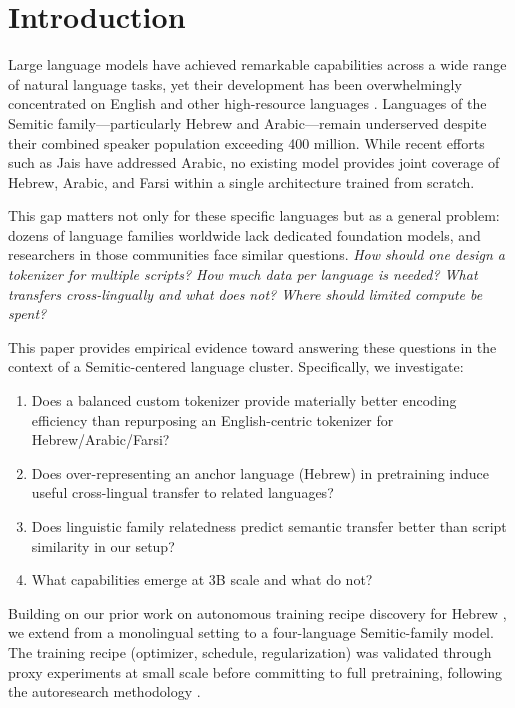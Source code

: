 \documentclass[10pt,twocolumn]{article}
\begin{document}
\section{Introduction}

Large language models have achieved remarkable capabilities across a wide range of natural language tasks, yet their development has been overwhelmingly concentrated on English and other high-resource languages \citep{joshi2020state}. Languages of the Semitic family---particularly Hebrew and Arabic---remain underserved despite their combined speaker population exceeding 400 million. While recent efforts such as Jais \citep{sengupta2023jais} have addressed Arabic, no existing model provides joint coverage of Hebrew, Arabic, and Farsi within a single architecture trained from scratch.

This gap matters not only for these specific languages but as a general problem: dozens of language families worldwide lack dedicated foundation models, and researchers in those communities face similar questions. \emph{How should one design a tokenizer for multiple scripts? How much data per language is needed? What transfers cross-lingually and what does not? Where should limited compute be spent?}

This paper provides empirical evidence toward answering these questions in the context of a Semitic-centered language cluster. Specifically, we investigate:

\begin{enumerate}
    \item Does a balanced custom tokenizer provide materially better encoding efficiency than repurposing an English-centric tokenizer for Hebrew/Arabic/Farsi?
    \item Does over-representing an anchor language (Hebrew) in pretraining induce useful cross-lingual transfer to related languages?
    \item Does linguistic family relatedness predict semantic transfer better than script similarity in our setup?
    \item What capabilities emerge at 3B scale and what do not?
\end{enumerate}

Building on our prior work on autonomous training recipe discovery for Hebrew \citep{slasky2026hebrew}, we extend from a monolingual setting to a four-language Semitic-family model. The training recipe (optimizer, schedule, regularization) was validated through proxy experiments at small scale before committing to full pretraining, following the autoresearch methodology \citep{karpathy2026autoresearch}.
\end{document}

